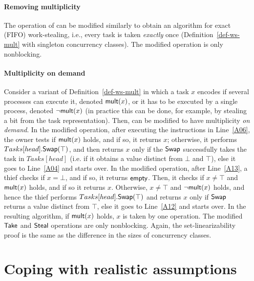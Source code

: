 \paragraph*{Removing multiplicity}

The \Take operation of \BNBWSM can be modified similarly to obtain an algorithm for exact (FIFO) work-stealing, i.e., every task is taken \emph{exactly} once (Definition~\ref{def-ws-mult} with singleton concurrency classes). The modified \Take operation is only nonblocking.

\paragraph*{Multiplicity on demand}

Consider a variant of Definition~\ref{def-ws-mult} in which a task \(x\) encodes if several processes can execute it, denoted \({\sf mult}(x)\), or it has to be executed by a single process, denoted \({\sf \neg mult}(x)\) (in practice this can be done, for example, by stealing a bit from the task representation). Then, \WFWSM can be modified to have multiplicity \emph{on demand}. In the modified \Take operation, after executing the instructions in Line~\ref{A06}, the owner tests if \({\sf mult}(x)\) holds, and if so, it returns \(x\); otherwise, it performs \(Tasks[head].{\sf Swap}(\top)\), and then returns \(x\) only if the \({\sf Swap}\) successfully takes the task in \(Tasks[head]\) (i.e. if it obtains a value distinct from $\bot$ and $\top$), else it goes to Line~\ref{A04} and starts over. In the modified \Steal operation, after Line~\ref{A13}, a thief checks if \(x = \bot\), and if so, it returns \({\sf empty}\). Then, it checks if \(x \neq \top\) and \({\sf mult}(x)\) holds, and if so it returns \(x\).  Otherwise, \(x \neq \top\) and \({\sf \neg mult}(x)\) holds, and hence the thief performs \(Tasks[head].{\sf Swap}(\top)\) and returns \(x\) only if \({\sf Swap}\) returns a value distinct from \(\top\), else it goes to Line~\ref{A12} and starts over.  In the resulting algorithm, if \({\sf mult}(x)\) holds, \(x\) is taken by one operation.  The modified ${\sf Take}$ and ${\sf Steal}$ operations are only nonblocking.  Again, the set-linearizability proof is the same as the difference in the sizes of concurrency classes.

\section{\label{sec-removing-infinite-arrays}Coping with realistic assumptions}

